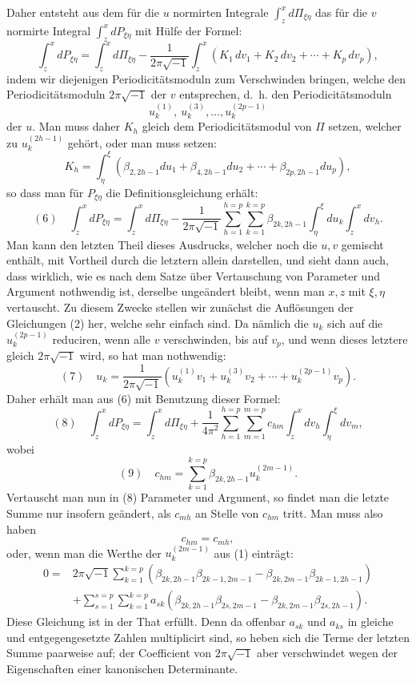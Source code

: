 \documentclass[10pt]{article}
\begin{document}
Daher entsteht aus dem für die \(u\) normirten Integrale \(\int_z^x d\Pi_{\xi\eta}\) das für die \(v\) normirte Integral \(\int_z^x dP_{\xi\eta}\) mit Hülfe der Formel:
\[
\int_z^x dP_{\xi\eta}
=
\int_z^x d\Pi_{\xi\eta}
-\frac{1}{2\pi\sqrt{-1}}
 \int_z^x(K_1\,dv_1+K_2\,dv_2+\cdots+K_p\,dv_p),
\]
indem wir diejenigen Periodicitätsmoduln zum Verschwinden bringen, welche den Periodicitätsmoduln \(2\pi\sqrt{-1}\) der \(v\) entsprechen, d.\ h. den Periodicitätsmoduln
\[
u_k^{(1)},\ u_k^{(3)},\ldots,u_k^{(2p-1)}
\]
der \(u\). Man muss daher \(K_h\) gleich dem Periodicitätsmodul von \(\Pi\) setzen, welcher zu \(u_k^{(2h-1)}\) gehört, oder man muss setzen:
\[
K_h=\int_{\eta}^{\xi}(\beta_{2,2h-1}du_1+\beta_{4,2h-1}du_2+\cdots+\beta_{2p,2h-1}du_p),
\]
so dass man für \(P_{\xi\eta}\) die Definitionsgleichung erhält:
\[
(6)\quad
\int_z^x dP_{\xi\eta}
=
\int_z^x d\Pi_{\xi\eta}
-\frac{1}{2\pi\sqrt{-1}}
\sum_{h=1}^{h=p}\sum_{k=1}^{k=p}
\beta_{2k,2h-1}\int_{\eta}^{\xi}du_k\int_z^x dv_h.
\]
Man kann den letzten Theil dieses Ausdrucks, welcher noch die \(u,v\) gemischt enthält, mit Vortheil durch die letztern allein darstellen, und sieht dann auch, dass wirklich, wie es nach dem Satze über Vertauschung von Parameter und Argument nothwendig ist, derselbe ungeändert bleibt, wenn man \(x,z\) mit \(\xi,\eta\) vertauscht. Zu diesem Zwecke stellen wir zunächst die Auflösungen der Gleichungen (2) her, welche sehr einfach sind. Da nämlich die \(u_k\) sich auf die \(u_k^{(2p-1)}\) reduciren, wenn alle \(v\) verschwinden, bis auf \(v_p\), und wenn dieses letztere gleich \(2\pi\sqrt{-1}\) wird, so hat man nothwendig:
\[
(7)\quad
u_k=\frac{1}{2\pi\sqrt{-1}}
\left(u_k^{(1)}v_1+u_k^{(3)}v_2+\cdots+u_k^{(2p-1)}v_p\right).
\]
Daher erhält man aus (6) mit Benutzung dieser Formel:
\[
(8)\quad
\int_z^x dP_{\xi\eta}
=
\int_z^x d\Pi_{\xi\eta}
+\frac{1}{4\pi^2}
\sum_{h=1}^{h=p}\sum_{m=1}^{m=p}
c_{hm}\int_z^x dv_h\int_{\eta}^{\xi}dv_m,
\]
wobei
\[
(9)\quad
c_{hm}=\sum_{k=1}^{k=p}\beta_{2k,2h-1}u_k^{(2m-1)}.
\]
Vertauscht man nun in (8) Parameter und Argument, so findet man die letzte Summe nur insofern geändert, als \(c_{mh}\) an Stelle von \(c_{hm}\) tritt. Man muss also haben
\[
c_{hm}=c_{mh},
\]
oder, wenn man die Werthe der \(u_k^{(2m-1)}\) aus (1) einträgt:
\[
\begin{aligned}
0={}&2\pi\sqrt{-1}\sum_{k=1}^{k=p}
(\beta_{2k,2h-1}\beta_{2k-1,2m-1}
-\beta_{2k,2m-1}\beta_{2k-1,2h-1})\\
&+\sum_{s=1}^{s=p}\sum_{k=1}^{k=p}a_{sk}
(\beta_{2k,2h-1}\beta_{2s,2m-1}
-\beta_{2k,2m-1}\beta_{2s,2h-1}).
\end{aligned}
\]
Diese Gleichung ist in der That erfüllt. Denn da offenbar \(a_{sk}\) und \(a_{ks}\) in gleiche und entgegengesetzte Zahlen multiplicirt sind, so heben sich die Terme der letzten Summe paarweise auf; der Coefficient von \(2\pi\sqrt{-1}\) aber verschwindet wegen der Eigenschaften einer kanonischen Determinante.
\end{document}
